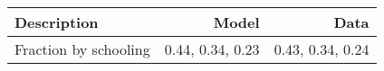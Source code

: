 \begin{tabular}{lrr}
\hline
Description & Model  & Data  \\ 
\hline
Fraction by schooling & 0.44, 0.34, 0.23  & 0.43, 0.34, 0.24  \\ 
\hline
\end{tabular}%
